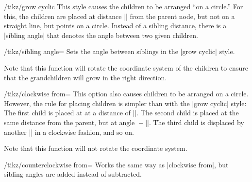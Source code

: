 \begin{key}{/tikz/grow cyclic}
  This style causes the children to be arranged ``on a circle.'' For
  this, the children are placed at distance |\tikzleveldistance| from
  the parent node, but not on a straight line, but points on a
  circle. Instead of a sibling distance, there is a |sibling angle|
  that denotes the angle between two given children.
  \begin{key}{/tikz/sibling angle=}
    Sets the angle between siblings in the |grow cyclic| style.
  \end{key}
  Note that this function will rotate the coordinate system of the
  children to ensure that the grandchildren will grow in the right
  direction.
\begin{codeexample}[]
\end{codeexample}
\end{key}

\begin{key}{/tikz/clockwise from=}
  This option also causes children to be arranged on a
  circle. However, the rule for placing children is simpler than with
  the |grow cyclic| style: The first child is placed at
   at a distance of |\tikzleveldistance|. The second child
  is placed at the same distance from the parent, but at angle
  ${}-{}$|\tikzsiblingangle|. The third child is displaced
  by another |\tikzsiblingangle| in a clockwise fashion, and so on. 

  Note that this function will not rotate the coordinate system.
\begin{codeexample}[]
\end{codeexample}
\end{key}

\begin{key}{/tikz/counterclockwise from=}
  Works the same way as |clockwise from|, but sibling angles are added
  instead of subtracted.
\end{key}

